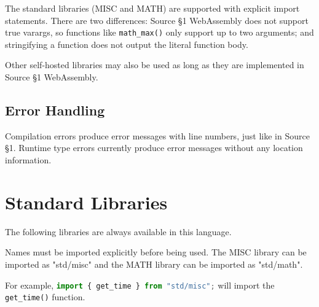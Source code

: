 The standard libraries (MISC and MATH) are supported with explicit import statements.  There are two differences:  Source \S 1 WebAssembly does not support true varargs, so functions like \lstinline{math_max()} only support up to two arguments; and stringifying a function does not output the literal function body.

Other self-hosted libraries may also be used as long as they are implemented in Source \S 1 WebAssembly.

\subsection*{Error Handling}

Compilation errors produce error messages with line numbers, just like in Source \S 1.  Runtime type errors currently produce error messages without any location information.





\newpage























\section{Standard Libraries}

The following libraries are always available in this language.

Names must be imported explicitly before being used.  The MISC library can be imported as "std/misc" and the MATH library can be imported as "std/math".

For example, \lstinline[language=javascript]!import { get_time } from "std/misc";! will import the \lstinline{get_time()} function.








